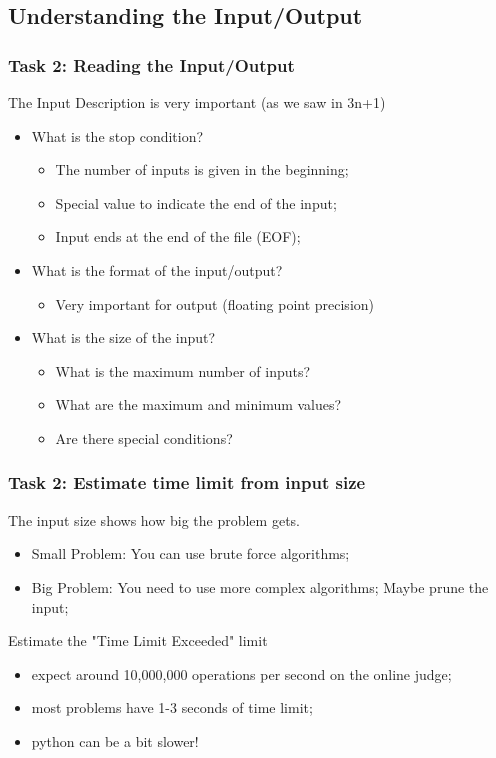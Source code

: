 \subsection{Understanding the Input/Output}

\begin{frame}
  \frametitle{Task 2: Reading the Input/Output}
  The Input Description is \alert{very important} (as we saw in 3n+1)
  \bigskip

  \begin{itemize}
  \item What is the stop condition?
  \begin{itemize}
    \item The number of inputs is given in the beginning;
    \item Special value to indicate the end of the input;
    \item Input ends at the end of the file (EOF);
  \end{itemize}
  \medskip

  \item What is the format of the input/output?
  \begin{itemize}
    \item Very important for output (floating point precision)
  \end{itemize}
  \medskip

  \item What is the size of the input?
  \begin{itemize}
    \item What is the maximum number of inputs?
    \item What are the maximum and minimum values?
    \item Are there special conditions?
  \end{itemize}
  \end{itemize}
\end{frame}

\begin{frame}
  \frametitle{Task 2: Estimate time limit from input size}

  The input size shows how big the problem gets.

  \begin{itemize}
    \item Small Problem: You can use brute force algorithms;
    \item Big Problem: You need to use more complex algorithms; Maybe \alert{prune} the input;
  \end{itemize}
  \bigskip

  \begin{block}{Estimate the "Time Limit Exceeded" limit}
    \begin{itemize}
    \item expect around 10,000,000 operations per second on the online judge;
    \item most problems have 1-3 seconds of time limit;
    \item python can be a bit slower!
    \end{itemize}
  \end{block}
\end{frame}


